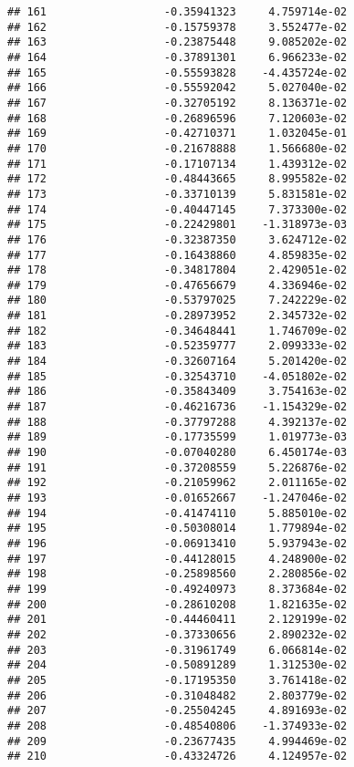 \documentclass[
]{article}
\begin{document}
\begin{verbatim}
## 161                  -0.35941323     4.759714e-02
## 162                  -0.15759378     3.552477e-02
## 163                  -0.23875448     9.085202e-02
## 164                  -0.37891301     6.966233e-02
## 165                  -0.55593828    -4.435724e-02
## 166                  -0.55592042     5.027040e-02
## 167                  -0.32705192     8.136371e-02
## 168                  -0.26896596     7.120603e-02
## 169                  -0.42710371     1.032045e-01
## 170                  -0.21678888     1.566680e-02
## 171                  -0.17107134     1.439312e-02
## 172                  -0.48443665     8.995582e-02
## 173                  -0.33710139     5.831581e-02
## 174                  -0.40447145     7.373300e-02
## 175                  -0.22429801    -1.318973e-03
## 176                  -0.32387350     3.624712e-02
## 177                  -0.16438860     4.859835e-02
## 178                  -0.34817804     2.429051e-02
## 179                  -0.47656679     4.336946e-02
## 180                  -0.53797025     7.242229e-02
## 181                  -0.28973952     2.345732e-02
## 182                  -0.34648441     1.746709e-02
## 183                  -0.52359777     2.099333e-02
## 184                  -0.32607164     5.201420e-02
## 185                  -0.32543710    -4.051802e-02
## 186                  -0.35843409     3.754163e-02
## 187                  -0.46216736    -1.154329e-02
## 188                  -0.37797288     4.392137e-02
## 189                  -0.17735599     1.019773e-03
## 190                  -0.07040280     6.450174e-03
## 191                  -0.37208559     5.226876e-02
## 192                  -0.21059962     2.011165e-02
## 193                  -0.01652667    -1.247046e-02
## 194                  -0.41474110     5.885010e-02
## 195                  -0.50308014     1.779894e-02
## 196                  -0.06913410     5.937943e-02
## 197                  -0.44128015     4.248900e-02
## 198                  -0.25898560     2.280856e-02
## 199                  -0.49240973     8.373684e-02
## 200                  -0.28610208     1.821635e-02
## 201                  -0.44460411     2.129199e-02
## 202                  -0.37330656     2.890232e-02
## 203                  -0.31961749     6.066814e-02
## 204                  -0.50891289     1.312530e-02
## 205                  -0.17195350     3.761418e-02
## 206                  -0.31048482     2.803779e-02
## 207                  -0.25504245     4.891693e-02
## 208                  -0.48540806    -1.374933e-02
## 209                  -0.23677435     4.994469e-02
## 210                  -0.43324726     4.124957e-02

\end{verbatim}
\end{document}
